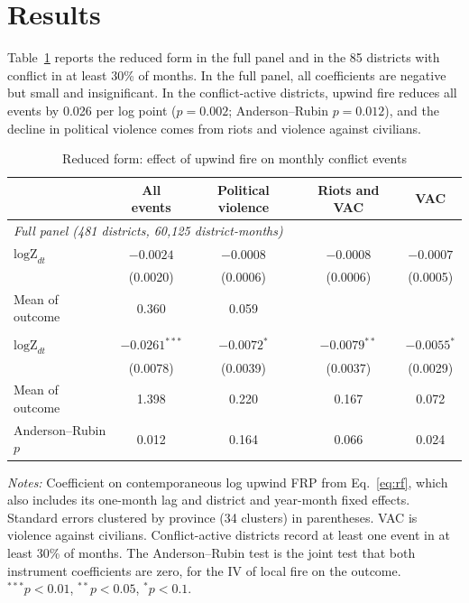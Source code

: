 \documentclass[12pt]{article}
\begin{document}
\section{Results}
\label{sec:results}

Table~\ref{tab:rf} reports the reduced form in the full panel and in the 85 districts with conflict in at least 30\% of months. In the full panel, all coefficients are negative but small and insignificant. In the conflict-active districts, upwind fire reduces all events by 0.026 per log point ($p=0.002$; Anderson--Rubin $p=0.012$), and the decline in political violence comes from riots and violence against civilians.

\begin{table}[H]
\centering
\caption{Reduced form: effect of upwind fire on monthly conflict events}
\label{tab:rf}
\footnotesize
\begin{tabular}{lcccc}
\toprule
 & All events & Political violence & Riots and VAC & VAC \\
\midrule
\multicolumn{5}{l}{\emph{Full panel (481 districts, 60,125 district-months)}} \\
$\text{logZ}_{dt}$ & $-0.0024$ & $-0.0008$ & $-0.0008$ & $-0.0007$ \\
 & (0.0020) & (0.0006) & (0.0006) & (0.0005) \\
Mean of outcome & 0.360 & 0.059 & & \\
\addlinespace
\multicolumn{5}{l}{\emph{Conflict-active districts (85 districts, 10,625 district-months)}} \\
$\text{logZ}_{dt}$ & $-0.0261^{***}$ & $-0.0072^{*}$ & $-0.0079^{**}$ & $-0.0055^{*}$ \\
 & (0.0078) & (0.0039) & (0.0037) & (0.0029) \\
Mean of outcome & 1.398 & 0.220 & 0.167 & 0.072 \\
Anderson--Rubin $p$ & 0.012 & 0.164 & 0.066 & 0.024 \\
\bottomrule
\end{tabular}
\begin{minipage}{0.95\textwidth}
\vspace{4pt}
\footnotesize \emph{Notes:} Coefficient on contemporaneous log upwind FRP from Eq.~\eqref{eq:rf}, which also includes its one-month lag and district and year-month fixed effects. Standard errors clustered by province (34 clusters) in parentheses. VAC is violence against civilians. Conflict-active districts record at least one event in at least 30\% of months. The Anderson--Rubin test is the joint test that both instrument coefficients are zero, for the IV of local fire on the outcome. $^{***}p<0.01$, $^{**}p<0.05$, $^{*}p<0.1$.
\end{minipage}
\end{table}
\end{document}
